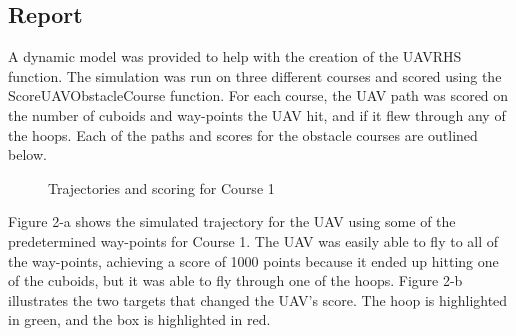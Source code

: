 \documentclass[12pt]{article}
\begin{document}
\subsection*{\centering Report} 
A dynamic model was provided to help with the creation of the UAVRHS function. 
The simulation was run on three different courses and scored using the ScoreUAVObstacleCourse function. For each course, the UAV path was scored on the number of cuboids and way-points the UAV hit, and if it flew through any of the hoops. Each of the paths and scores for the obstacle courses are outlined below. 
\begin{figure}[H]
	\caption{Trajectories and scoring for Course 1}
\end{figure}
Figure 2-a shows the simulated trajectory for the UAV using some of the predetermined way-points for Course 1. The UAV was easily able to fly to all of the way-points, achieving a score of 1000 points because it ended up hitting one of the cuboids, but it was able to fly through one of the hoops. Figure 2-b illustrates the two targets that changed the UAV's score. The hoop is highlighted in green, and the box is highlighted in red. 
\end{document}
